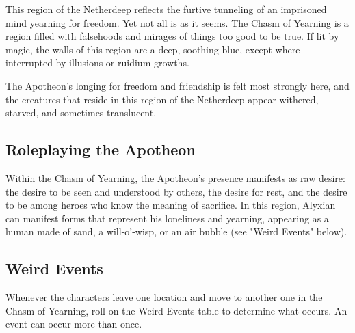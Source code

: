\documentclass[letterpaper, 11pt, bg=full, twocolumn]{dndbook}
\begin{document}
This region of the Netherdeep reflects the furtive tunneling of an imprisoned mind yearning for freedom. Yet not all is as it seems. The Chasm of Yearning is a region filled with falsehoods and mirages of things too good to be true. If lit by magic, the walls of this region are a deep, soothing blue, except where interrupted by illusions or ruidium growths.

The Apotheon's longing for freedom and friendship is felt most strongly here, and the creatures that reside in this region of the Netherdeep appear withered, starved, and sometimes translucent.

\subsection{Roleplaying the Apotheon}

Within the Chasm of Yearning, the Apotheon's presence manifests as raw desire: the desire to be seen and understood by others, the desire for rest, and the desire to be among heroes who know the meaning of sacrifice. In this region, Alyxian can manifest forms that represent his loneliness and yearning, appearing as a human made of sand, a will-o'-wisp, or an air bubble (see "Weird Events" below).

\subsection{Weird Events}

Whenever the characters leave one location and move to another one in the Chasm of Yearning, roll on the Weird Events table to determine what occurs. An event can occur more than once.
\end{document}
